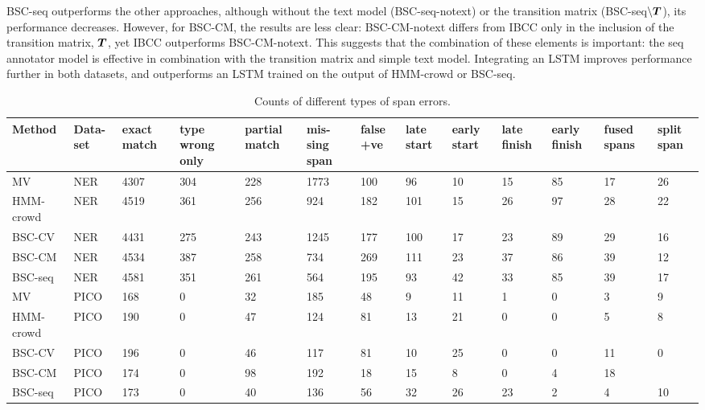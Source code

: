 BSC-seq outperforms the other approaches, although 
without the text model (BSC-seq-notext) or the transition matrix (BSC-seq$\backslash\boldsymbol T$),
its performance decreases.
However, for BSC-CM, the results are less clear: BSC-CM-notext differs from IBCC only in the 
inclusion of the transition matrix, $\boldsymbol T$, yet IBCC outperforms BSC-CM-notext.
This suggests that the combination of these elements is important: the seq annotator model is effective 
in combination with the transition matrix and simple text model.
Integrating an LSTM improves performance further in both datasets, and outperforms an LSTM trained on the output of HMM-crowd or BSC-seq.

\begin{table}[h]
\small
\begin{tabularx}{\textwidth}{l X X X X X X X X X X X X}
\toprule
Method & Data-set & exact match & type wrong only & partial match & mis-sing span & false +ve & late start & early start & late finish & early finish & fused spans & split span \\ \midrule
MV & NER & 4307 & 304 & 228 & 1773 & 100 & 96 & 10 & 15 & 85 & 17 & 26 \\
HMM-crowd & NER & 4519 & 361 & 256 & 924 & 182 & 101 & 15 & 26 & 97 & 28 & 22 \\
BSC-CV & NER & 4431 & 275 & 243 & 1245 & 177 & 100 & 17 & 23 & 89 & 29 & 16 \\
BSC-CM & NER & 4534 & 387 & 258 & 734 & 269 & 111 & 23 & 37 & 86 & 39 & 12 \\
BSC-seq & NER & 4581 & 351 & 261 & 564 & 195 & 93 & 42 & 33 & 85 & 39 & 17 
\\
\midrule 
MV & PICO    & 168 & 0 & 32 & 185 & 48 & 9 & 11 & 1 & 0 & 3 & 9 \\
HMM-crowd    & PICO & 190 & 0 & 47 & 124 & 81 & 13 & 21 & 0 & 0 & 5 & 8 \\
BSC-CV       & PICO & 196 & 0 & 46 & 117 & 81 & 10 & 25 & 0 & 0 & 11 & 0 \\
BSC-CM       & PICO & 174 & 0 & 98 & 192 & 18 & 15 & 8  & 0 & 4 & 18 \\
BSC-seq      & PICO & 173 & 0 & 40 & 136 & 56 & 32 & 26 & 23 & 2 & 4 & 10
\bottomrule
\end{tabularx}
\caption{Counts of different types of span errors.}
\label{tab:error_analysis}
\end{table}
